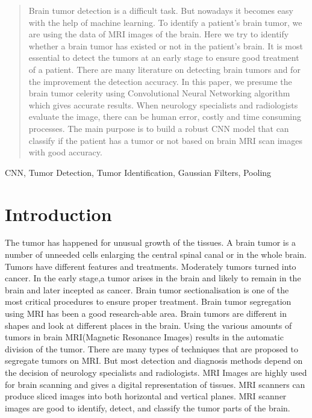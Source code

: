 \documentclass[conference]{IEEEtran}
\begin{document}
\begin{abstract}
Brain tumor detection is a difficult task. But nowadays it becomes easy with the help of machine learning. To identify a patient's brain tumor, we are using the data of MRI images of the brain. Here we try to identify whether a brain tumor has existed or not in the patient's brain. It is most essential to detect the tumors at an early stage to ensure good treatment of a patient. There are many literature on detecting brain tumors and for the improvement the detection accuracy. In this paper, we presume the brain tumor celerity using Convolutional Neural Networking algorithm which gives accurate results. When neurology specialists and radiologists evaluate the image, there can be human error, costly and time consuming processes. The main purpose is to build a robust CNN model that can classify if the patient has a tumor or not based on brain MRI scan images with good accuracy. 
\end{abstract}

\begin{IEEEkeywords}
CNN, Tumor Detection, Tumor Identification, Gaussian Filters, Pooling
\end{IEEEkeywords}

\section*{Introduction}
The tumor has happened for unusual growth of the tissues. A brain tumor is a number of unneeded cells enlarging the central spinal canal or in the whole brain. Tumors have different features and treatments. Moderately tumors turned into cancer. In the early stage,a tumor arises in the brain and likely to remain in the brain and later incepted as cancer. Brain tumor sectionalisation is one of the most critical procedures to ensure proper treatment. Brain tumor segregation using MRI has been a good research-able area. Brain tumors are different in shapes and look at different places in the brain. Using the various amounts of tumors in brain MRI(Magnetic Resonance Images) results in the automatic division of the tumor. There are many types of techniques that are proposed to segregate tumors on MRI. But most detection and diagnosis methods depend on the decision of neurology specialists and radiologists. MRI Images are highly used for brain scanning and gives a digital representation of tissues. MRI scanners can produce sliced images into both horizontal and vertical planes. MRI scanner images are good to identify, detect, and classify the tumor parts of the brain.\cite{b1} 
\end{document}
